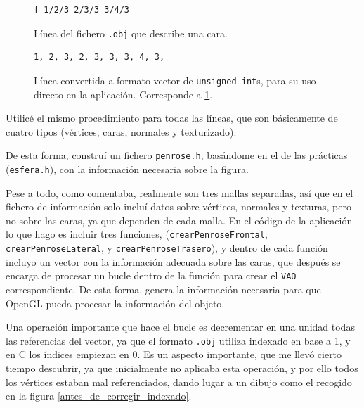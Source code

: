 \documentclass[a4paper,12pt]{article}
\begin{document}
\begin{figure}[h]
    \centering
    \begin{minipage}[c]{0.7\textwidth}
        \begin{lstlisting}
f 1/2/3 2/3/3 3/4/3
        \end{lstlisting}
    \end{minipage}
    \caption{Línea del fichero \texttt{.obj} que describe una cara.} \label{lineas_obj}
\end{figure}
\begin{figure}[h]
    \centering
    \begin{minipage}[c]{0.7\textwidth}
        \begin{lstlisting}
1, 2, 3, 2, 3, 3, 3, 4, 3,
        \end{lstlisting}
    \end{minipage}
    \caption{Línea convertida a formato vector de \texttt{unsigned int}s, para su uso directo en la aplicación. Corresponde a \ref{lineas_obj}.} \label{lineas_obj_convertidas}
\end{figure}

Utilicé el mismo procedimiento para todas las líneas, que son básicamente de cuatro tipos (vértices, caras, normales y texturizado).

De esta forma, construí un fichero \texttt{penrose.h}, basándome en el de las prácticas (\texttt{esfera.h}), con la información necesaria sobre la figura.

Pese a todo, como comentaba, realmente son tres mallas separadas, así que en el fichero de información solo incluí datos sobre vértices, normales y texturas, pero no sobre las caras, ya que dependen de cada malla. En el código de la aplicación lo que hago es incluir tres funciones, (\texttt{crearPenroseFrontal}, \texttt{crearPenroseLateral}, y \texttt{crearPenroseTrasero}), y dentro de cada función incluyo un vector con la información adecuada sobre las caras, que después se encarga de procesar un bucle dentro de la función para crear el \texttt{VAO} correspondiente. De esta forma, genera la información necesaria para que OpenGL pueda procesar la información del objeto.

Una operación importante que hace el bucle es decrementar en una unidad todas las referencias del vector, ya que el formato \texttt{.obj} utiliza indexado en base a 1, y en C los índices empiezan en 0. Es un aspecto importante, que me llevó cierto tiempo descubrir, ya que inicialmente no aplicaba esta operación, y por ello todos los vértices estaban mal referenciados, dando lugar a un dibujo como el recogido en la figura \ref{antes_de_corregir_indexado}.
\end{document}
